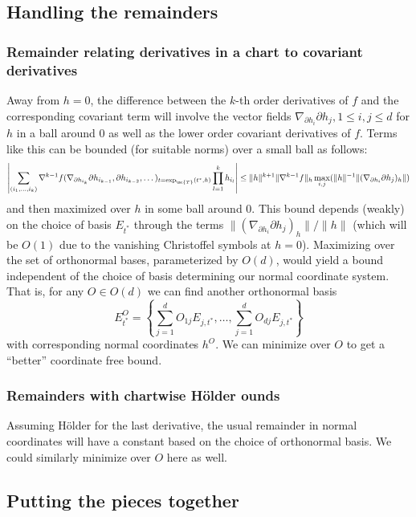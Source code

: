 \documentclass{article}
\begin{document}
\subsection{Handling the remainders}

\subsubsection{Remainder relating derivatives in a chart to covariant derivatives}

Away from $h=0$, the difference between the $k$-th order derivatives of $f$
and the corresponding covariant term will involve 
the vector fields $\nabla_{\partial h_i} \partial h_j, 1 \leq i,j \leq d$ for $h$ in a ball around 0 as well as the lower order covariant derivatives of $f$. Terms like this can be bounded (for suitable norms) over a small ball as follows:
\begin{equation}
  \label{eq:lower:covariant}
\left|\sum_{(i_1,\dots,i_k)} \nabla^{k-1} f(\nabla_{\partial h_{i_k}}\partial h_{i_{k-1}}, \partial h_{i_{k-2}}, \dots)_{t=\exp_{\mc{T}}(t^*, h)} \prod_{l=1}^k h_{i_l}\right|
\leq \|h\|^{k+1} \|\nabla^{k-1}f\|_h \max_{i,j} (\|h\|^{-1}\|(\nabla_{\partial h_i}\partial h_j)_h\|)
\end{equation}
and then maximized over $h$ in some ball around 0. This bound depends (weakly) on the choice of basis $E_{t^*}$ through the terms $\|(\nabla_{\partial h_i}\partial h_j)_h\|/\|h\|$ (which will be $O(1)$ due to
the vanishing Christoffel symbols at $h=0$). Maximizing
over the set of orthonormal bases, parameterized by $O(d)$, would yield a bound independent of the choice of
basis determining our normal
coordinate system. That is, for any $O \in O(d)$ we can find another orthonormal basis
$$
E^O_{t^*} = \left\{\sum_{j=1}^d O_{1j}E_{j,t^*}, \dots, \sum_{j=1}^d O_{dj}E_{j,t^*} \right\}
$$
with corresponding normal coordinates $h^O$. We can minimize over $O$ to get a ``better'' coordinate free bound.

\subsubsection{Remainders with chartwise H\"older ounds}

Assuming H\"older for the last derivative, the usual remainder in normal coordinates
will have a constant based on the choice of orthonormal basis. We could similarly minimize over $O$ here as well.

\subsection{Putting the pieces together}
\end{document}
